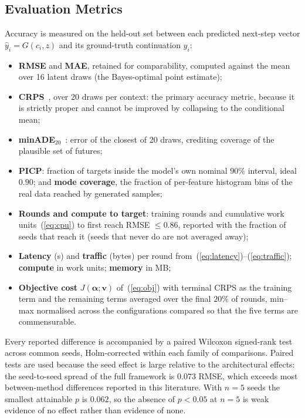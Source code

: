 \documentclass[journal]{IEEEtran}
\newcommand{\valpha}{\boldsymbol{\alpha}}
\newcommand{\J}{J}
\begin{document}
\subsection{Evaluation Metrics}
Accuracy is measured on the held-out set between each predicted next-step
vector $\hat{y}_i=G(c_i,z)$ and its ground-truth continuation $y_i$:
\begin{itemize}
\item \textbf{RMSE} and \textbf{MAE}, retained for comparability, computed
      against the mean over 16 latent draws (the Bayes-optimal point estimate);
\item \textbf{CRPS}~\cite{gneiting2007crps}, over 20 draws per context: the
      primary accuracy metric, because it is strictly proper and cannot be
      improved by collapsing to the conditional mean;
\item \textbf{minADE$_{20}$}~\cite{gupta2018socialgan}: error of the closest of
      20 draws, crediting coverage of the plausible set of futures;
\item \textbf{PICP}: fraction of targets inside the model's own nominal $90\%$
      interval, ideal $0.90$; and \textbf{mode coverage}, the fraction of
      per-feature histogram bins of the real data reached by generated samples;
\item \textbf{Rounds and compute to target}: training rounds and cumulative work
      units~(\ref{eq:cpu}) to first reach RMSE $\le0.86$, reported with the
      fraction of seeds that reach it (seeds that never do are not averaged
      away);
\item \textbf{Latency} (s) and \textbf{traffic} (bytes) per round
      from~(\ref{eq:latency})--(\ref{eq:traffic}); \textbf{compute} in work
      units; \textbf{memory} in MB;
\item \textbf{Objective cost} $\J(\valpha;\mathbf{v})$ of~(\ref{eq:obj}) with
      terminal CRPS as the training term and the remaining terms averaged over
      the final $20\%$ of rounds, min--max normalised across the configurations
      compared so that the five terms are commensurable.
\end{itemize}
Every reported difference is accompanied by a paired Wilcoxon signed-rank test
across common seeds, Holm-corrected within each family of comparisons. Paired
tests are used because the seed effect is large relative to the architectural
effects: the seed-to-seed spread of the full framework is $0.073$ RMSE, which
exceeds most between-method differences reported in this literature. With
$n=5$ seeds the smallest attainable $p$ is $0.062$, so the absence of
$p<0.05$ at $n=5$ is weak evidence of no effect rather than evidence of none.
\end{document}

